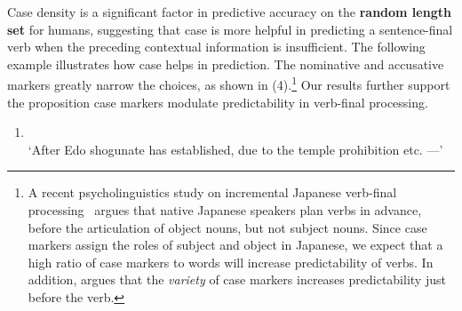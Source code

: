 Case density is a significant factor in predictive accuracy on the
{\bf random length set} for humans, suggesting that case is more
helpful in predicting a sentence-final verb when the preceding
contextual information is insufficient. The following example
illustrates how case helps in prediction. The nominative and
accusative markers greatly narrow the choices, as shown in
(4).\footnote{A recent psycholinguistics study on incremental Japanese
  verb-final processing~\cite{momma2015timing} argues that native
  Japanese speakers plan verbs in advance, before the articulation of
  object nouns, but not subject nouns. Since case markers assign the
  roles of subject and object in Japanese, we expect that a high ratio
  of case markers to words will increase predictability of verbs. In
  addition,  argues that the
  \textit{variety} of case markers increases predictability just
  before the verb.} Our results further support the proposition case
markers modulate predictability in  verb-final processing.
















































\begin{enumerate}[(4)]
 \setlength{\parskip}{-0.1cm}
 \item \label{quat-ex2}
  \gl{---}{} \\
  `After Edo shogunate has established, due to the temple prohibition etc. ---'
\end{enumerate}






















